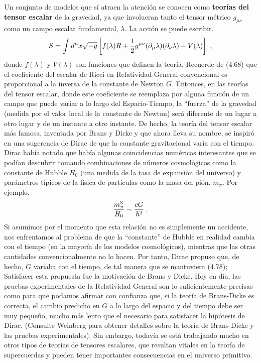 \documentclass[11pt,b5paper,openany,twoside]{book}
\newcommand{\mn}{{\mu\nu}}
\newcommand{\p}[1]{{\partial_{#1}}}
\def\g{{\sqrt{-g}}}
\begin{document}
Un conjunto de modelos que sí atraen la atención se conocen como {\bf teorías del tensor escalar} de la gravedad, ya que involucran tanto el tensor métrico $g_\mn$ como un campo escalar fundamental, $\lambda$.
La acción se puede escribir.
\begin{equation}
S = \int d^nx \g \left[f(\lambda)R+{1\over 2}g^\mn(\p\mu\lambda)
(\p\nu\lambda) -V(\lambda)\right]\ ,\label{4.77}
\end{equation}
donde $f(\lambda)$ y $V(\lambda)$ son funciones que definen la teoría.
Recuerde de (4.68) que el coeficiente del escalar de Ricci en Relatividad General convencional es proporcional a la inversa de la constante de Newton $G$.
Entonces, en las teorías del tensor escalar, donde este coeficiente se reemplaza por alguna función de un campo que puede variar a lo largo del Espacio-Tiempo, la ``fuerza'' de la gravedad (medida por el valor local de la constante de Newton) será diferente de un lugar a otro lugar y de un instante a otro instante.
De hecho, la teoría del tensor escalar más famosa, inventada por Brans y Dicke y que ahora lleva su nombre, se inspiró en una sugerencia de Dirac de que la constante gravitacional varía con el tiempo.
Dirac había notado que había algunas coincidencias numéricas interesantes que se podían descubrir tomando combinaciones de números cosmológicos como la constante de Hubble $H_0$ (una medida de la tasa de expansión del universo) y parámetros típicos de la física de partículas como la masa del pión, $m_\pi$.
Por ejemplo,
\begin{equation}
{{m_\pi^3}\over{H_0}}\sim {{cG}\over{\hbar^2}}\,.\label{4.78}
\end{equation}
Si asumimos por el momento que esta relación no es simplemente un accidente, nos enfrentamos al problema de que la ``constante'' de Hubble en realidad cambia con el tiempo (en la mayoría de los modelos cosmológicos), mientras que las otras cantidades convencionalmente no lo hacen.
Por tanto, Dirac propuso que, de hecho, $G$ variaba con el tiempo, de tal manera que se mantuviera (4.78); Satisfacer esta propuesta fue la motivación de Brans y Dicke.
Hoy en día, las pruebas experimentales de la Relatividad General son lo suficientemente precisas como para que podamos afirmar con confianza que, si la teoría de Brans-Dicke es correcta, el cambio predicho en $G$ a lo largo del espacio y del tiempo debe ser muy pequeño, mucho más lento que el necesario para satisfacer la hipótesis de Dirac.
(Consulte Weinberg para obtener detalles sobre la teoría de Brans-Dicke y las pruebas experimentales).
Sin embargo, todavía se está trabajando mucho en otros tipos de teorías de tensores escalares, que resultan vitales en la teoría de supercuerdas y pueden tener importantes consecuencias en el universo primitivo.
\end{document}

